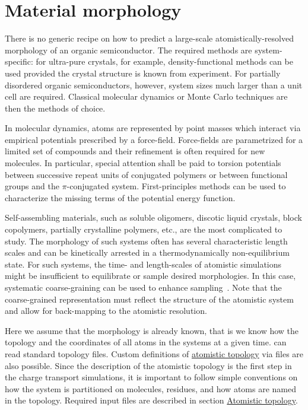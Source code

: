 \section{Material morphology}
\label{sec:morphology}

There is no generic recipe on how to predict a large-scale atomistically-resolved morphology of an organic semiconductor. The required methods are system-specific: for ultra-pure crystals, for example, density-functional methods can be used provided the crystal structure is known from experiment. For partially disordered organic semiconductors, however, system sizes much larger than a unit cell  are required. Classical molecular dynamics or Monte Carlo techniques are then the methods of choice. 

In molecular dynamics, atoms are represented by point masses which interact via empirical potentials prescribed by a force-field. Force-fields are parametrized for a limited set of compounds and their refinement is often required for new molecules. In particular, special attention shall be paid to torsion potentials between successive repeat units of conjugated polymers or between functional groups and the $\pi$-conjugated system. First-principles methods can be used to characterize the missing terms of the potential energy function. 

Self-assembling materials, such as soluble oligomers, discotic liquid crystals, block copolymers, partially crystalline polymers, etc., are the most complicated to study. The morphology of such systems often has several characteristic length scales and can be kinetically arrested in a thermodynamically non-equilibrium state. For such systems, the time- and length-scales of atomistic simulations might be insufficient to equilibrate or sample desired morphologies. In this case, systematic coarse-graining can be used to enhance sampling~\cite{ruehle_versatile_2009}. Note that the coarse-grained representation must reflect the structure of the atomistic system and allow for back-mapping to the atomistic resolution.

Here we assume that the morphology is already known, that is we know how the topology and the coordinates of all atoms in the systems at a given time. \votcact can read standard \gromacs topology files. Custom definitions of \hyperref[sec:atomistic]{atomistic topology} via \xml files are also possible. Since the description of the atomistic topology is the first step in the charge transport simulations, it is important to follow simple conventions on how the system is partitioned on molecules, residues, and how atoms are named in the topology. Required input files are described in section \hyperref[sec:atomistic]{Atomistic topology}. 
